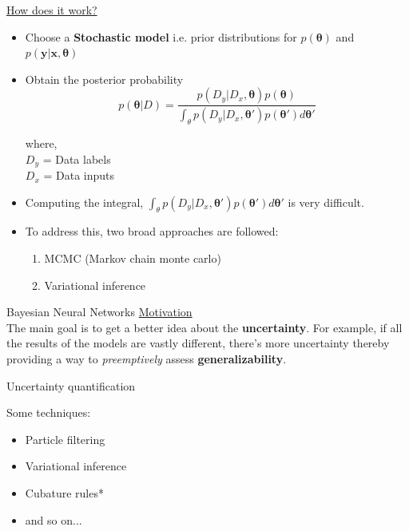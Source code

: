 \documentclass[11pt, aspectratio=169]{beamer}
\begin{document}
\begin{frame}
    \underline{How does it work?}

    \begin{itemize}
        \item Choose a \textbf{Stochastic model} i.e.  prior distributions for $p(\mathbf{\theta})$ and $p(\mathbf{y|x,\boldsymbol{\theta}})$
        \item Obtain the posterior probability
            \begin{equation}
                p(\boldsymbol{\theta}|D) = \frac{p(D_y|D_x,\boldsymbol{\theta})p(\boldsymbol{\theta})}{\int_\theta p(D_y|D_x, \boldsymbol{\theta'})p(\boldsymbol{\theta'})d\boldsymbol{\theta'}}
            \end{equation}

            where, \\
                $D_y$ = Data labels \\ 
                $D_x$ = Data inputs \\

        \item Computing the integral, $\int_\theta p(D_y|D_x, \boldsymbol{\theta'})p(\boldsymbol{\theta'})d\boldsymbol{\theta'}$ is very difficult. 
        \item To address this, two broad approaches are followed:
            \begin{enumerate}
                \item MCMC (Markov chain monte carlo)
                \item Variational inference
            \end{enumerate}
    \end{itemize}

\end{frame}

\begin{frame}{ Bayesian Neural Networks}
    \underline{Motivation} \\
    The main goal is to get a better idea about the \textbf{uncertainty}. 
    For example, if all the results of the models are vastly 
    different, there's more uncertainty thereby providing a way to 
    \textit{preemptively} assess \textbf{generalizability}.
    


\end{frame}


\begin{frame}{Uncertainty quantification}    
    
    Some techniques:
    \begin{itemize}
        \item Particle filtering 
        \item Variational inference
        \item Cubature rules*
        \item and so on...
    \end{itemize}


\end{frame}
\end{document}
